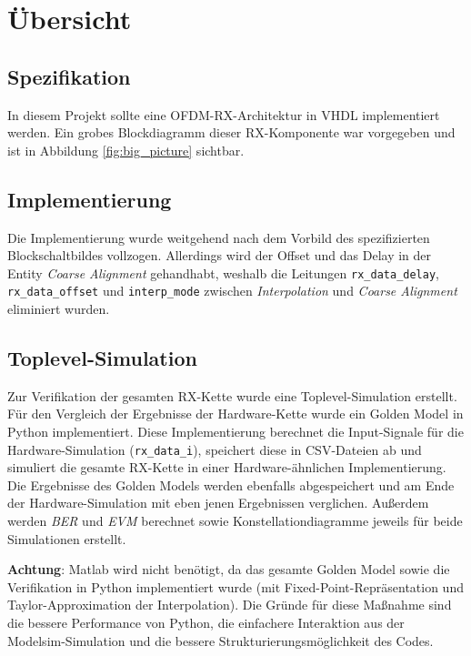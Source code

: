 \newpage

\section{Übersicht}
\subsection{Spezifikation}
In diesem Projekt sollte eine OFDM-RX-Architektur in VHDL implementiert werden. Ein grobes Blockdiagramm dieser RX-Komponente war vorgegeben und ist in Abbildung \ref{fig:big_picture} sichtbar.


\subsection{Implementierung}
Die Implementierung wurde weitgehend nach dem Vorbild des spezifizierten Blockschaltbildes vollzogen. Allerdings wird der Offset und das Delay in der Entity \emph{Coarse Alignment} gehandhabt, weshalb die Leitungen \texttt{rx\_data\_delay}, \texttt{rx\_data\_offset} und \texttt{interp\_mode} zwischen \emph{Interpolation} und \emph{Coarse Alignment} eliminiert wurden.

\subsection{Toplevel-Simulation}
Zur Verifikation der gesamten RX-Kette wurde eine Toplevel-Simulation erstellt. Für den Vergleich der Ergebnisse der Hardware-Kette wurde ein Golden Model in Python implementiert. Diese Implementierung berechnet die Input-Signale für die Hardware-Simulation (\texttt{rx\_data\_i}), speichert diese in CSV-Dateien ab und simuliert die gesamte RX-Kette in einer Hardware-ähnlichen Implementierung. Die Ergebnisse des Golden Models werden ebenfalls abgespeichert und am Ende der Hardware-Simulation mit eben jenen Ergebnissen verglichen. Außerdem werden \emph{BER} und \emph{EVM} berechnet sowie Konstellationdiagramme jeweils für beide Simulationen erstellt.

\vspace{10pt}
\noindent
\textbf{Achtung}: Matlab wird nicht benötigt, da das gesamte Golden Model sowie die Verifikation in Python implementiert wurde (mit Fixed-Point-Repräsentation und Taylor-Approximation der Interpolation). Die Gründe für diese Maßnahme sind die bessere Performance von Python, die einfachere Interaktion aus der Modelsim-Simulation und die bessere Strukturierungsmöglichkeit des Codes.


